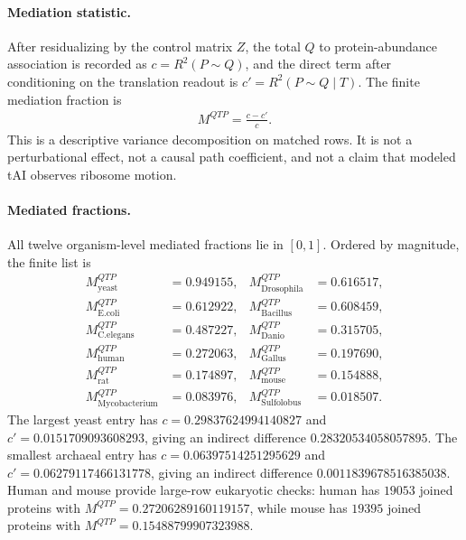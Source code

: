 \paragraph{Mediation statistic.}
After residualizing by the control matrix $Z$, the total $Q$ to protein-abundance association is recorded as $c=R^2(P\sim Q)$, and the direct term after conditioning on the translation readout is $c'=R^2(P\sim Q\mid T)$. The finite mediation fraction is
$$\begin{aligned}
M^{QTP}=\frac{c-c'}{c}.
\end{aligned}$$
This is a descriptive variance decomposition on matched rows. It is not a perturbational effect, not a causal path coefficient, and not a claim that modeled tAI observes ribosome motion.

\paragraph{Mediated fractions.}
All twelve organism-level mediated fractions lie in $[0,1]$. Ordered by magnitude, the finite list is
$$\begin{aligned}
M^{QTP}_{\mathrm{yeast}}&=0.949155, & M^{QTP}_{\mathrm{Drosophila}}&=0.616517,\\
M^{QTP}_{\mathrm{E.coli}}&=0.612922, & M^{QTP}_{\mathrm{Bacillus}}&=0.608459,\\
M^{QTP}_{\mathrm{C.elegans}}&=0.487227, & M^{QTP}_{\mathrm{Danio}}&=0.315705,\\
M^{QTP}_{\mathrm{human}}&=0.272063, & M^{QTP}_{\mathrm{Gallus}}&=0.197690,\\
M^{QTP}_{\mathrm{rat}}&=0.174897, & M^{QTP}_{\mathrm{mouse}}&=0.154888,\\
M^{QTP}_{\mathrm{Mycobacterium}}&=0.083976, & M^{QTP}_{\mathrm{Sulfolobus}}&=0.018507.
\end{aligned}$$
The largest yeast entry has $c=0.29837624994140827$ and $c'=0.0151709093608293$, giving an indirect difference $0.28320534058057895$. The smallest archaeal entry has $c=0.06397514251295629$ and $c'=0.06279117466131778$, giving an indirect difference $0.0011839678516385038$. Human and mouse provide large-row eukaryotic checks: human has $19053$ joined proteins with $M^{QTP}=0.27206289160119157$, while mouse has $19395$ joined proteins with $M^{QTP}=0.15488799907323988$.

